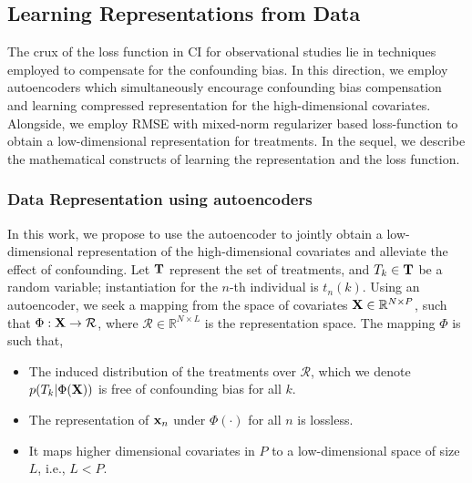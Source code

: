 \documentclass[twoside,11pt]{article}
\begin{document}
\subsection{Learning Representations from Data}
\label{sec:balancing}
The crux of the loss function in CI for observational studies lie in techniques employed to compensate for the confounding bias. In this direction, we employ autoencoders which simultaneously encourage confounding bias compensation and learning compressed representation for the high-dimensional covariates. Alongside, we employ RMSE with mixed-norm regularizer based loss-function to obtain a low-dimensional representation for treatments. In the sequel, we describe the mathematical constructs of learning the representation and the loss function. 

\subsubsection{Data Representation using autoencoders}
In this work, we propose to use the autoencoder to jointly obtain a low-dimensional representation of the high-dimensional covariates and alleviate the effect of confounding. Let $\mathbf{T}$ represent the set of treatments, and $T_k \in \mathbf{T}$ be a random variable; instantiation for the $n$-th individual is $t_n(k)$. Using an autoencoder, we seek a mapping from the space of covariates $\mathbf{X} \in \mathbb{R}^{N \times P}$, such that $\Phi: \mathbf{X} \rightarrow \mathcal{R}$, where $\mathcal{R} \in \mathbb{R}^{N \times L}$ is the representation space. The mapping $\Phi$ is such that,
\begin{itemize}
    \item The induced distribution of the treatments over $\mathcal{R}$, which we denote $p(T_k |\Phi(\mathbf{X}))$ is free of confounding bias for all $k$. 
    \item The representation of $\mathbf{x}_n$ under $\Phi(\cdot)$ for all $n$ is lossless.
    \item It maps higher dimensional covariates in $P$ to a low-dimensional space of size $L$, i.e., $L < P$.
\end{itemize}
\end{document}
